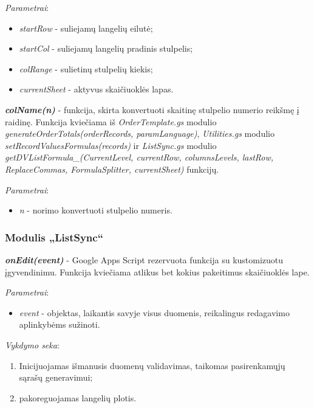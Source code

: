 \bigskip
\textit{Parametrai}:
\begin{itemize}
    \itemsep0em 
    \item \textit{startRow} - suliejamų langelių eilutė;
    \item \textit{startCol} - suliejamų langelių pradinis stulpelis;
    \item \textit{colRange} - sulietinų stulpelių kiekis;
    \item \textit{currentSheet} - aktyvus skaičiuoklės lapas.
\end{itemize}

\bigskip
\textit{\textbf{colName(n)}} - funkcija, skirta konvertuoti skaitinę stulpelio numerio reikšmę į raidinę. Funkcija kviečiama iš \textit{OrderTemplate.gs} modulio \textit{generateOrderTotals(orderRecords, paramLanguage)}, \textit{Utilities.gs} modulio \textit{setRecordValuesFormulas(records)} ir \textit{ListSync.gs} modulio \textit{getDVListFormula\_(CurrentLevel, currentRow, columnsLevels, lastRow, ReplaceCommas,  FormulaSplitter, currentSheet)} funkcijų.

\bigskip
\textit{Parametrai}:
\begin{itemize}
    \itemsep0em 
    \item \textit{n} - norimo konvertuoti stulpelio numeris.
\end{itemize}



\subsubsection{Modulis „ListSync“}
\textit{\textbf{onEdit(event)}} - Google Apps Script rezervuota funkcija su kustomizuotu įgyvendinimu. Funkcija kviečiama atlikus bet kokius pakeitimus skaičiuoklės lape. 

\bigskip
\textit{Parametrai}:
\begin{itemize}
    \itemsep0em 
    \item \textit{event} - objektas, laikantis savyje visus duomenis, reikalingus redagavimo aplinkybėms sužinoti.
\end{itemize}

\bigskip
\textit{Vykdymo seka}:
\begin{enumerate}
    \itemsep0em 
    \item Inicijuojamas išmanusis duomenų validavimas, taikomas pasirenkamųjų sąrašų generavimui;
    \item pakoreguojamas langelių plotis.
\end{enumerate}

